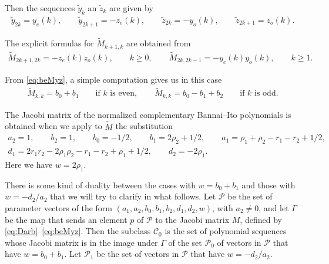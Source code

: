 \documentclass[pdftex]{sigma}
\def\cC{\mathcal C}
\def\cP{\mathcal P}
\numberwithin{equation}{section}
\begin{document}
Then the sequences $\tilde y_k$ an $\tilde z_k$ are given by
\begin{gather*}%
\tilde y_{2k}= y_e(k), \qquad \tilde y_{2k+1}= - z_e(k),\qquad
 \tilde z_{2k}= - y_o(k), \qquad \tilde	z_{2 k+1}= z_o(k).
\end{gather*}

The explicit formulas for $\tilde M_{k+1,k}$ are obtained from
\begin{gather*}%
 \tilde M_{2k+1,2k}= -z_e(k) z_o(k),\qquad  k\ge 0,\qquad
 \tilde M_{2k, 2k-1}= - y_e(k) y_o(k), \qquad  k\ge 1.
\end{gather*}

From \eqref{eq:beMyz}, a simple computation gives us in this case
\begin{gather*}%
	\tilde M_{k,k}= b_0+b_1 \qquad \text{if $k$ is even}, \qquad
	\tilde M_{k,k}= b_0-b_1+b_2 \qquad \text{if $k$ is odd}.
\end{gather*}

The Jacobi matrix of the normalized complementary Bannai--Ito polynomials is obtained when we apply to $\tilde M$ the substitution{\samepage
\begin{gather*}
a_2=1,\qquad b_2=1,\qquad b_0=-1/2,\qquad b_1=2 \rho_2+1/2,\qquad a_1=\rho_1+\rho_2-r_1-r_2+1/2, \\
 d_1=2 r_1 r_2 -2 \rho_1 \rho_2 -r_1-r_2+\rho_1+1/2,\qquad d_2=-2 \rho_1.
\end{gather*}
Here we have $w=2 \rho_1$.}


There is some kind of duality between the cases with $w=b_0+b_1$ and those with $w=-d_2/a_2$ that we will try to clarify in what follows.
Let $\cP$ be the set of parameter vectors of the form $(a_1, a_2, b_0, b_1, b_2, d_1,d_2,w)$, with $a_2\ne 0$, and let $\Gamma$ be the map that sends an element $p$ of $\cP$ to the Jacobi matrix $M$, defined by \eqref{eq:Darb}--\eqref{eq:beMyz}. Then the subclass $\cC_0$ is the set of polynomial sequences whose Jacobi matrix is in the image under $\Gamma$ of the set $\cP_0$ of vectors in $\cP$ that have $w=b_0+ b_1$. Let $\cP_1$ be the set of vectors in $\cP$ that have $w=-d_2/a_2$.
\end{document}
